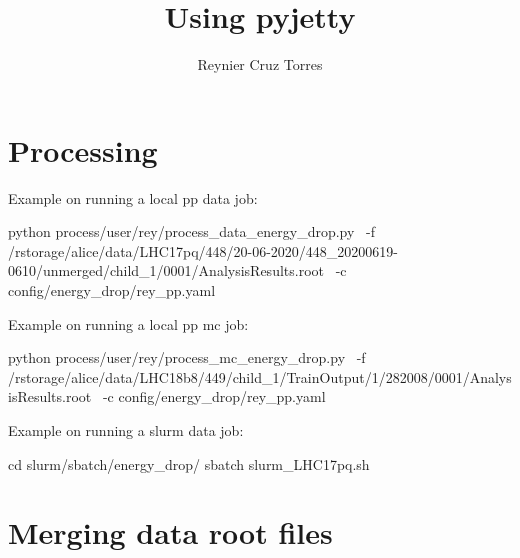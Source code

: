 \documentclass[12pt]{article}
\title{Using pyjetty}
\author{Reynier Cruz Torres}
\begin{document}
\maketitle

\tableofcontents

\newpage
\section{Processing}

Example on running a local pp data job:

\begin{tcolorbox}
\begin{verbnobox}[\scriptsize]
python process/user/rey/process_data_energy_drop.py \
-f /rstorage/alice/data/LHC17pq/448/20-06-2020/448_20200619-0610/unmerged/child_1/0001/AnalysisResults.root \
-c config/energy_drop/rey_pp.yaml
\end{verbnobox}  
\end{tcolorbox}

Example on running a local pp mc job:
\begin{tcolorbox}
\begin{verbnobox}[\scriptsize]
python process/user/rey/process_mc_energy_drop.py \
-f /rstorage/alice/data/LHC18b8/449/child_1/TrainOutput/1/282008/0001/AnalysisResults.root \
-c config/energy_drop/rey_pp.yaml
\end{verbnobox}  
\end{tcolorbox}

Example on running a slurm data job:
\begin{tcolorbox}
\begin{verbnobox}[\scriptsize]
cd slurm/sbatch/energy_drop/
sbatch slurm_LHC17pq.sh
\end{verbnobox}  
\end{tcolorbox}

\section{Merging data root files}
\end{document}
